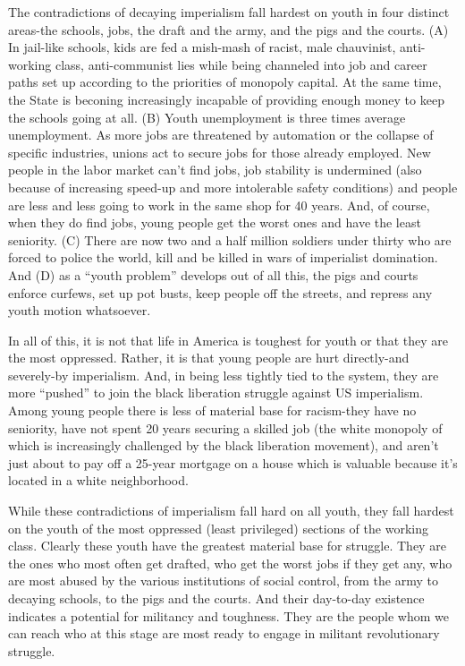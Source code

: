 \documentclass[12pt, titlepage]{article}
\begin{document}
{\begin{spacing}{1.10}
The contradictions of decaying imperialism fall hardest on youth in four distinct areas-the schools, jobs, the draft and the army, and the pigs and the courts. (A) In jail-like schools, kids are fed a mish-mash of racist, male chauvinist, anti-working class, anti-communist lies while being channeled into job and career paths set up according to the priorities of monopoly capital. At the same time, the State is beconing increasingly incapable of providing enough money to keep the schools going at all. (B) Youth unemployment is three times average unemployment. As more jobs are threatened by automation or the collapse of specific industries, unions act to secure jobs for those already employed. New people in the labor market can't find jobs, job stability is undermined (also because of increasing speed-up and more intolerable safety conditions) and people are less and less going to work in the same shop for 40 years. And, of course, when they do find jobs, young people get the worst ones and have the least seniority. (C) There are now two and a half million soldiers under thirty who are forced to police the world, kill and be killed in wars of imperialist domination. And (D) as a ``youth problem'' develops out of all this, the pigs and courts enforce curfews, set up pot busts, keep people off the streets, and repress any youth motion whatsoever.

In all of this, it is not that life in America is toughest for youth or that they are the most oppressed. Rather, it is that young people are hurt directly-and severely-by imperialism. And, in being less tightly tied to the system, they are more ``pushed'' to join the black liberation struggle against US imperialism. Among young people there is less of material base for racism-they have no seniority, have not spent 20 years securing a skilled job (the white monopoly of which is increasingly challenged by the black liberation movement), and aren't just about to pay off a 25-year mortgage on a house which is valuable because it's located in a white neighborhood.

While these contradictions of imperialism fall hard on all youth, they fall hardest on the youth of the most oppressed (least privileged) sections of the working class. Clearly these youth have the greatest material base for struggle. They are the ones who most often get drafted, who get the worst jobs if they get any, who are most abused by the various institutions of social control, from the army to decaying schools, to the pigs and the courts. And their day-to-day existence indicates a potential for militancy and toughness. They are the people whom we can reach who at this stage are most ready to engage in militant revolutionary struggle.


\end{spacing}}
\end{document}
